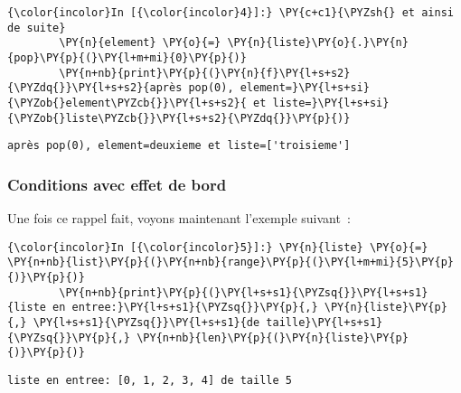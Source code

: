     \begin{Verbatim}[commandchars=\\\{\}]
{\color{incolor}In [{\color{incolor}4}]:} \PY{c+c1}{\PYZsh{} et ainsi de suite}
        \PY{n}{element} \PY{o}{=} \PY{n}{liste}\PY{o}{.}\PY{n}{pop}\PY{p}{(}\PY{l+m+mi}{0}\PY{p}{)}
        \PY{n+nb}{print}\PY{p}{(}\PY{n}{f}\PY{l+s+s2}{\PYZdq{}}\PY{l+s+s2}{après pop(0), element=}\PY{l+s+si}{\PYZob{}element\PYZcb{}}\PY{l+s+s2}{ et liste=}\PY{l+s+si}{\PYZob{}liste\PYZcb{}}\PY{l+s+s2}{\PYZdq{}}\PY{p}{)}
\end{Verbatim}


    \begin{Verbatim}[commandchars=\\\{\}]
après pop(0), element=deuxieme et liste=['troisieme']

    \end{Verbatim}

    \hypertarget{conditions-avec-effet-de-bord}{%
\subsubsection{Conditions avec effet de
bord}\label{conditions-avec-effet-de-bord}}

    Une fois ce rappel fait, voyons maintenant l'exemple suivant~:

    \begin{Verbatim}[commandchars=\\\{\}]
{\color{incolor}In [{\color{incolor}5}]:} \PY{n}{liste} \PY{o}{=} \PY{n+nb}{list}\PY{p}{(}\PY{n+nb}{range}\PY{p}{(}\PY{l+m+mi}{5}\PY{p}{)}\PY{p}{)}
        \PY{n+nb}{print}\PY{p}{(}\PY{l+s+s1}{\PYZsq{}}\PY{l+s+s1}{liste en entree:}\PY{l+s+s1}{\PYZsq{}}\PY{p}{,} \PY{n}{liste}\PY{p}{,} \PY{l+s+s1}{\PYZsq{}}\PY{l+s+s1}{de taille}\PY{l+s+s1}{\PYZsq{}}\PY{p}{,} \PY{n+nb}{len}\PY{p}{(}\PY{n}{liste}\PY{p}{)}\PY{p}{)}
\end{Verbatim}


    \begin{Verbatim}[commandchars=\\\{\}]
liste en entree: [0, 1, 2, 3, 4] de taille 5

    \end{Verbatim}

